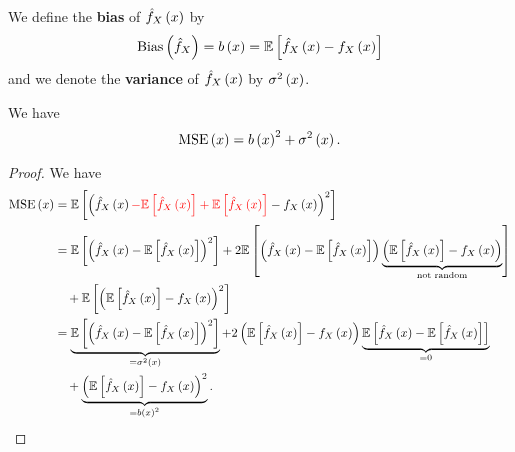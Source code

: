 \begin{definition}
  We define the \textbf{bias} of $\hat{f}_X\left(x\right)$ by
  \begin{equation*}
    \mathrm{Bias}\left(\hat{f}_X\right) = b\left(x\right) = \mathbb{E}\left[\hat{f}_X\left(x\right) - f_X\left(x\right)\right]
  \end{equation*}
  and we denote the \textbf{variance} of $\hat{f}_X\left(x\right)$ by $\sigma^2\left(x\right)$.
\end{definition}

\begin{proposition}
  We have
  \begin{equation*}
    \mathrm{MSE}\left(x\right) = b\left(x\right)^2 + \sigma^2\left(x\right).
  \end{equation*}
\end{proposition}
\begin{proof}
We have
  \begin{equation*}
    \begin{split}
      \mathrm{MSE}\left(x\right) &= \mathbb{E}\left[ \left(\hat{f}_X\left(x\right) {\color{red}- \mathbb{E}\left[\hat{f}_X\left(x\right)\right] + \mathbb{E}\left[\hat{f}_X\left(x\right)\right]} - f_X\left(x\right)\right)^2\right] \\
      &= \mathbb{E}\left[ \left(\hat{f}_X\left(x\right) - \mathbb{E}\left[\hat{f}_X\left(x\right)\right]\right)^2\right] + 2 \mathbb{E}\left[\left(\hat{f}_X\left(x\right)- \mathbb{E}\left[\hat{f}_X\left(x\right)\right]\right)\underbrace{\left(\mathbb{E}\left[\hat{f}_X\left(x\right)\right] - f_X\left(x\right)\right)}_{\text{not random}} \right] \\
      &\quad + \mathbb{E}\left[\left(\mathbb{E}\left[\hat{f}_X\left(x\right)\right] - f_X\left(x\right)\right)^2\right] \\
      &= \underbrace{\mathbb{E}\left[ \left(\hat{f}_X\left(x\right) - \mathbb{E}\left[\hat{f}_X\left(x\right)\right]\right)^2\right]}_{=\sigma^2\left(x\right)} + 2 \left(\mathbb{E}\left[\hat{f}_X\left(x\right)\right] - f_X\left(x\right)\right) \underbrace{\mathbb{E}\left[\hat{f}_X\left(x\right)- \mathbb{E}\left[\hat{f}_X\left(x\right)\right]\right] }_{=0} \\
      &\quad + \underbrace{\left(\mathbb{E}\left[\hat{f}_X\left(x\right)\right] - f_X\left(x\right)\right)^2}_{=b\left(x\right)^2}. \\
    \end{split}
  \end{equation*}
\end{proof}

